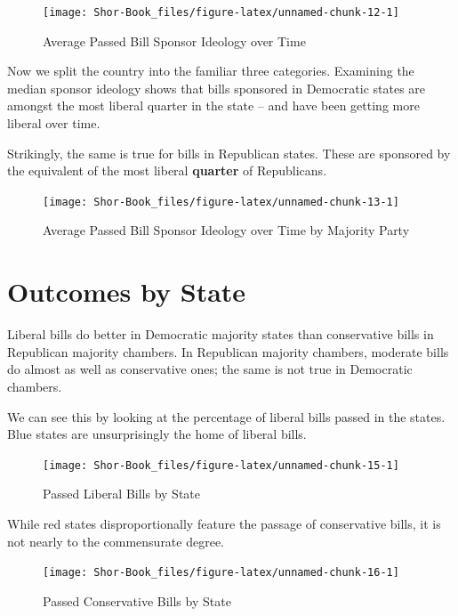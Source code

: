 \documentclass[
  oneside]{book}
\begin{document}
\begin{figure}
\texttt{[image: Shor-Book\_files/figure-latex/unnamed-chunk-12-1]} \caption{Average Passed Bill Sponsor Ideology over Time}\label{fig:unnamed-chunk-12}
\end{figure}

Now we split the country into the familiar three categories. Examining the median sponsor ideology shows that bills sponsored in Democratic states are amongst the most liberal quarter in the state -- and have been getting more liberal over time.

Strikingly, the same is true for bills in Republican states. These are sponsored by the equivalent of the most liberal \textbf{quarter} of Republicans.

\begin{figure}
\texttt{[image: Shor-Book\_files/figure-latex/unnamed-chunk-13-1]} \caption{Average Passed Bill Sponsor Ideology over Time by Majority Party}\label{fig:unnamed-chunk-13}
\end{figure}

\clearpage

\hypertarget{outcomes-by-state}{%
\section{Outcomes by State}\label{outcomes-by-state}}

Liberal bills do better in Democratic majority states than conservative bills in Republican majority chambers. In Republican majority chambers, moderate bills do almost as well as conservative ones; the same is not true in Democratic chambers.

We can see this by looking at the percentage of liberal bills passed in the states. Blue states are unsurprisingly the home of liberal bills.

\begin{figure}
\texttt{[image: Shor-Book\_files/figure-latex/unnamed-chunk-15-1]} \caption{Passed Liberal Bills by State}\label{fig:unnamed-chunk-15}
\end{figure}

While red states disproportionally feature the passage of conservative bills, it is not nearly to the commensurate degree.

\begin{figure}
\texttt{[image: Shor-Book\_files/figure-latex/unnamed-chunk-16-1]} \caption{Passed Conservative Bills by State}\label{fig:unnamed-chunk-16}
\end{figure}
\end{document}
